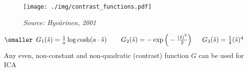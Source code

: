\begin{frame}{\subsubsecname}
 
 \begin{figure}
 	\centering
 	\texttt{[image: ./img/contrast\_functions.pdf]}
    \vspace{-0.5cm}
 	\caption*{\hspace{5cm}\textit{\tiny{Source: Hyv\"arinen, 2001}}}
 \end{figure}
 
 \begin{equation*}
 	\smaller
 \begin{array}{lll}
 	G_1(\hat{s}) = \frac{1}{a} \log \cosh (a \cdot \hat{s}) 
 	\;\;& \;\;G_2(\hat{s}) = -\exp \Big( -\frac{(\hat{s})^2}{2} \Big)
 	& \;\;G_3(\hat{s}) = \frac{1}{4} (\hat{s})^4
	\end{array}
 \end{equation*}
 Any even, non-constant and non-quadratic (contrast) function $G$ can be used for ICA
 
 
 \end{frame}

